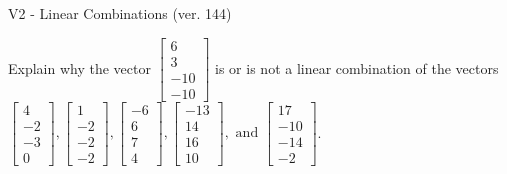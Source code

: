 \begin{exercise}
  \begin{exerciseTitle}V2 - Linear Combinations (ver. 144)\end{exerciseTitle}
  \begin{exerciseStatement}
    Explain why the vector \(\left[\begin{array}{c}
6 \\
3 \\
-10 \\
-10
\end{array}\right]\)  is or is not a linear 
	combination of the vectors \(\left[\begin{array}{c}
4 \\
-2 \\
-3 \\
0
\end{array}\right] , \left[\begin{array}{c}
1 \\
-2 \\
-2 \\
-2
\end{array}\right] , \left[\begin{array}{c}
-6 \\
6 \\
7 \\
4
\end{array}\right] , \left[\begin{array}{c}
-13 \\
14 \\
16 \\
10
\end{array}\right] , \text{ and } \left[\begin{array}{c}
17 \\
-10 \\
-14 \\
-2
\end{array}\right]\).
	



\end{exerciseStatement}
\end{exercise}
